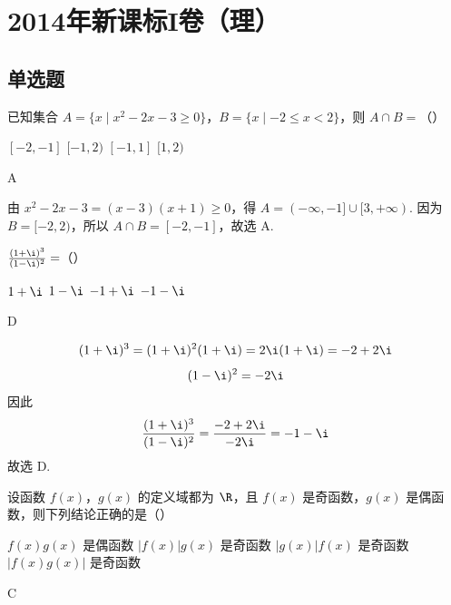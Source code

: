 \chapter{2014年新课标I卷（理）}

\section{单选题}

\begin{problem}
已知集合 \(A = \{x \mid x^2 - 2x - 3 \geqslant 0\}\)，\(B = \{x \mid -2 \leqslant x < 2\}\)，则 \(A \cap B =\)（\quad）

\choices
    {\([-2, -1]\)}
    {\([-1, 2)\)}
    {\([-1, 1]\)}
    {\([1,2)\)}
\end{problem}

\begin{answer}
A
\end{answer}

\begin{solution}
由 \(x^2-2x-3=(x-3)(x+1)\geqslant0\)，得
\(A=(-\infty,-1]\cup[3,+\infty)\). 因为 \(B=[-2,2)\)，所以
\(A\cap B=[-2,-1]\)，故选 A.
\end{solution}

\begin{problem}
\(\frac{(1 + \i)^3}{(1 - \i)^2} =\)（\quad）

\choices
    {\(1 + \i\)}
    {\(1 - \i\)}
    {\(-1 + \i\)}
    {\(-1 - \i\)}
\end{problem}

\begin{answer}
D
\end{answer}

\begin{solution}
\[
(1+\i)^3=(1+\i)^2(1+\i)=2\i(1+\i)=-2+2\i
\]
\[
(1-\i)^2=-2\i
\]
因此
\[
\frac{(1+\i)^3}{(1-\i)^2}=\frac{-2+2\i}{-2\i}=-1-\i
\]
故选 D.
\end{solution}

\begin{problem}
设函数 \(f(x)\)，\(g(x)\) 的定义域都为 \( \R \)，且 \( f(x) \) 是奇函数，\( g(x) \) 是偶函数，则下列结论正确的是（\quad）

\choices
    {\(f(x)g(x)\) 是偶函数}
    {\(|f(x)|g(x)\) 是奇函数}
    {\(|g(x)|f(x)\) 是奇函数}
    {\(|f(x)g(x)|\) 是奇函数}
\end{problem}

\begin{answer}
C
\end{answer}

